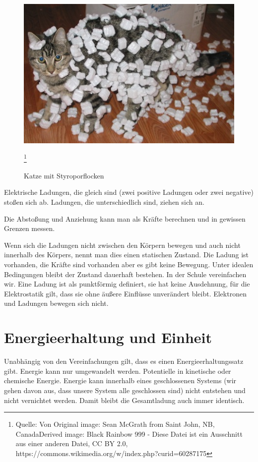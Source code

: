 \documentclass[a4paper]{article}
\begin{document}
  \begin{figure}[htb]
   \includegraphics{Cat_demonstrating_static_cling_with_styrofoam_peanuts.jpeg}
   \caption{Katze mit Styroporflocken}
   \label{abb:CatWidthStyropor}
   \footnote{Quelle: Von Original image: Sean McGrath from Saint John, NB, CanadaDerived image: Black Rainbow 999 - Diese Datei ist ein Ausschnitt aus einer anderen Datei, CC BY 2.0, https://commons.wikimedia.org/w/index.php?curid=60287175}
  \end{figure}

  Elektrische Ladungen, die gleich sind (zwei positive Ladungen oder zwei negative) stoßen sich ab. Ladungen, die unterschiedlich sind, ziehen sich an.

  Die Abstoßung und Anziehung kann man als Kräfte berechnen und in gewissen Grenzen messen.

  Wenn sich die Ladungen nicht zwischen den Körpern bewegen und auch nicht innerhalb des Körpers, nennt man dies einen statischen Zustand. Die Ladung ist vorhanden, die Kräfte sind vorhanden aber es gibt keine Bewegung. Unter idealen Bedingungen bleibt der Zustand dauerhaft bestehen. In der Schule vereinfachen wir. Eine Ladung ist als punktförmig definiert, sie hat keine Ausdehnung, für die Elektrostatik gilt, dass sie ohne äußere Einflüsse unverändert bleibt. Elektronen und Ladungen bewegen sich nicht.

  \section{Energieerhaltung und Einheit}
  Unabhängig von den Vereinfachungen gilt, dass es einen Energieerhaltungssatz gibt. Energie kann nur umgewandelt werden. Potentielle in kinetische oder chemische Energie. Energie kann innerhalb eines geschlossenen Systems (wir gehen davon aus, dass unsere System alle geschlossen sind) nicht entstehen und nicht vernichtet werden. Damit bleibt die Gesamtladung auch immer identisch.
\end{document}
